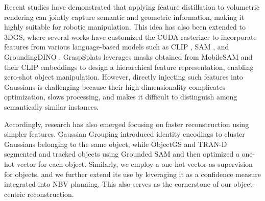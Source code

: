 Recent studies \cite{kobayashi2022decomposing, kerr2023lerf} have demonstrated that applying feature distillation to volumetric rendering can jointly capture semantic and geometric information, making it highly suitable for robotic manipulation. This idea has also been extended to \ac{3DGS}, where several works \cite{qiu2024feature, qin2024langsplat} have customized the CUDA rasterizer to incorporate features from various language-based models such as CLIP \cite{radford2021learning}, SAM \cite{kirillov2023segment}, and GroundingDINO \cite{liu2024grounding}. GraspSplats \cite{ji2024graspsplats} leverages masks obtained from MobileSAM \cite{zhang2023faster} and their CLIP embeddings to design a hierarchical feature representation, enabling zero-shot object manipulation. However, directly injecting such features into Gaussians is challenging because their high dimensionality complicates optimization, slows processing, and makes it difficult to distinguish among semantically similar instances.


Accordingly, research has also emerged focusing on faster reconstruction using simpler features. Gaussian Grouping \cite{ye2024gaussian} introduced identity encodings to cluster Gaussians belonging to the same object, while ObjectGS \cite{zhu2025objectgs} and TRAN-D \cite{kim2025tran} segmented and tracked objects using Grounded SAM \cite{ren2024grounded} and then optimized a one-hot vector for each object. Similarly, we employ a one-hot vector as supervision for objects, and we further extend its use by leveraging it as a confidence measure integrated into NBV planning. This also serves as the cornerstone of our object-centric reconstruction.

